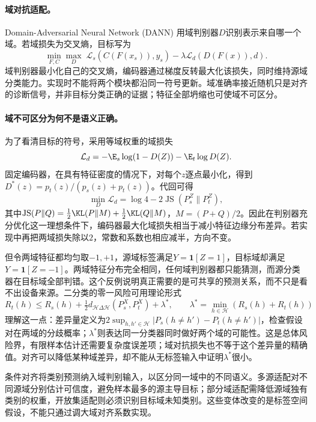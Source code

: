 \paragraph{域对抗适配。}
Domain-Adversarial Neural Network (DANN) 用域判别器$D$识别表示来自哪一个域\cite{ganin2016dann}。若域损失为交叉熵，目标写为
\begin{equation}
 \min_{F,C}\max_D\;\mathcal L_s(C(F(x_s)),y_s)
 -\lambda\mathcal L_d(D(F(x)),d).
\end{equation}
域判别器最小化自己的交叉熵，编码器通过梯度反转最大化该损失，同时维持源域分类能力。实现时不能将两个模块都沿同一符号更新。域准确率接近随机只是对齐的诊断信号，并非目标分类正确的证据；特征全部坍缩也可使域不可区分。

\paragraph{域不可区分为何不是语义正确。}
为了看清目标的符号，采用等域权重的域损失
\begin{equation}
 \mathcal L_d=-\E_s\log(1-D(Z))-\E_t\log D(Z).
\end{equation}
固定编码器，在具有特征密度的情况下，对每个$z$逐点最小化，得到$D^*(z)=p_t(z)/(p_s(z)+p_t(z))$。代回可得
\begin{equation}
 \min_D\mathcal L_d=\log4-2\operatorname{JS}(P_s^Z\|P_t^Z),
\end{equation}
其中$\operatorname{JS}(P\|Q)=\tfrac12\KL(P\|M)+\tfrac12\KL(Q\|M)$，$M=(P+Q)/2$。因此在判别器充分优化这一理想条件下，编码器最大化域损失相当于减小特征边缘分布差异。若实现中再把两域损失除以$2$，常数和系数也相应减半，方向不变。

但令两域特征都均匀取$-1,+1$，源域标签满足$Y=\mathbf1[Z=1]$，目标域却满足$Y=\mathbf1[Z=-1]$。两域特征分布完全相同，任何域判别器都只能猜测，而源分类器在目标域全部判错。这个反例说明真正需要的是可共享的预测关系，而不只是看不出设备来源。二分类的零一风险可用理论形式
\begin{equation}
 R_t(h)\leq R_s(h)+\tfrac12d_{\mathcal H\Delta\mathcal H}(P_s^X,P_t^X)+\lambda^*,
 \qquad \lambda^*=\min_{h\in\mathcal H}(R_s(h)+R_t(h))
\end{equation}
理解这一点：差异量定义为$2\sup_{h,h'\in\mathcal H}|P_s(h\ne h')-P_t(h\ne h')|$，检查假设对在两域的分歧概率；$\lambda^*$则表达同一分类器同时做好两个域的可能性。这是总体风险界，有限样本估计还需要复杂度误差项；域对抗损失也不等于这个差异量的精确值。对齐可以降低某种域差异，却不能从无标签输入中证明$\lambda^*$很小。

条件对齐将类别预测纳入域判别输入，以区分同一域中的不同语义。多源适配对不同源域分别估计可信度，避免样本最多的源主导目标；部分域适配需降低源域独有类别的权重，开放集适配则必须识别目标域未知类别。这些变体改变的是标签空间假设，不能只通过调大域对齐系数实现。

